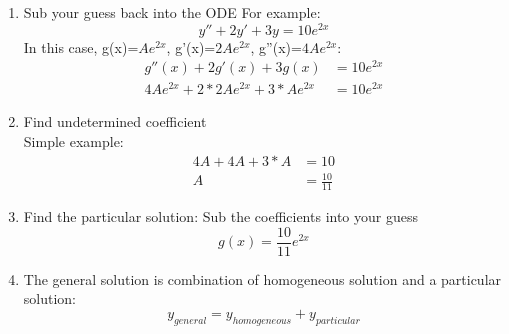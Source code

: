 \begin{enumerate}
	\item Sub your guess back into the ODE
	For example:
	$$y''+2y'+3y=10e^{2x}$$
	In this case, g(x)=$Ae^{2x}$, g'(x)=$2Ae^{2x}$, g''(x)=$4Ae^{2x}$:
	\begin{align*}
	g''(x)+2g'(x)+3g(x)&=10e^{2x}\\
	4Ae^{2x}+2*2Ae^{2x}+3*Ae^{2x}&=10e^{2x}
	\end{align*}
	\item Find undetermined coefficient\\
	Simple example:
	\begin{align*}
	4A+4A+3*A&=10\\
	A&=\frac{10}{11}
	\end{align*}
	
	\item Find the particular solution:
	Sub the coefficients into your guess
	$$g(x)=\frac{10}{11}e^{2x}$$
	
	\item The general solution is combination of homogeneous solution and a particular solution:
	\begin{equation}
	y_{general}=y_{homogeneous}+y_{particular}
	\end{equation}
	\end{enumerate}
	
	\newpage
	
